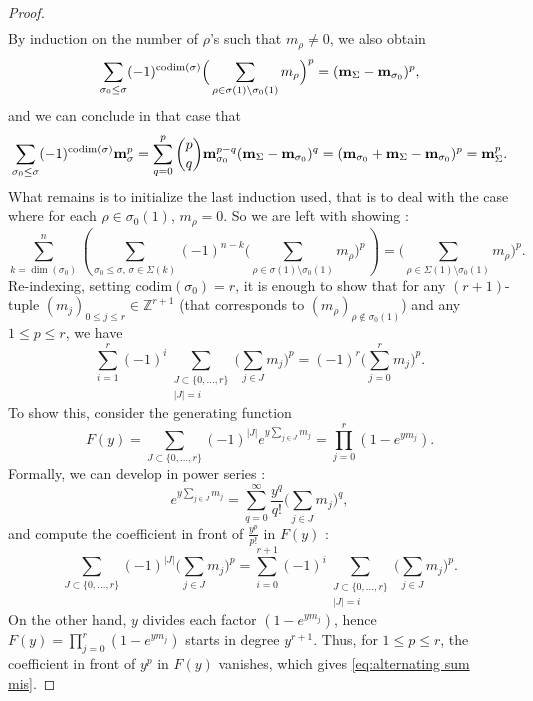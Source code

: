\documentclass[10pt,a4paper]{amsart}
\def\Z{\mathbb{Z}}
\def\codim{\mathrm{codim}}
\def\um{{\bf m}}
\begin{document}
\begin{proof}
$$\begin{array}{ccc}
 \end{array}
 $$
By induction on the number of $\rho$'s such that $m_\rho\neq 0$, we also obtain 
$$
\sum_{\sigma_0\leq\sigma} (-1)^{\codim(\sigma)} \Big(\sum_{\rho\in\sigma(1)\setminus\sigma_0(1)}m_\rho\Big)^p= (\um_\Sigma-\um_{\sigma_0})^p,
$$
and we can conclude in that case that 
$$
\sum_{\sigma_0\leq\sigma} (-1)^{\codim(\sigma)}\um_\sigma^p=\displaystyle \sum_{q=0}^{p} \binom{p}{q}\um_{\sigma_0}^{p-q}(\um_\Sigma-\um_{\sigma_0})^q=(\um_{\sigma_0}+\um_\Sigma-\um_{\sigma_0})^p=\um_\Sigma^p.
$$
What remains is to initialize the last induction used, that is to deal with the case where for each $\rho\in\sigma_0(1)$, $m_\rho=0$. So we are left with showing :
$$
\sum_{k=\dim(\sigma_0)}^n \left(\sum_{\sigma_0\leq\sigma,\,\sigma\in\Sigma(k)} (-1)^{n-k}\Big(\sum_{\rho\in\sigma(1)\setminus\sigma_0(1)}m_\rho\Big)^p\,\right)=\Big(\sum_{\rho\in\Sigma(1)\setminus \sigma_0(1)}m_\rho\Big)^p.
$$
Re-indexing, setting $\codim(\sigma_0)=r$, it is enough to show that for any $(r+1)$-tuple $(m_j)_{0\leq j\leq r}\in\Z^{r+1}$ (that corresponds to $(m_\rho)_{\rho\notin \sigma_0(1)}$) and any $1\leq p \leq r$, we have
\begin{equation}
 \label{eq:alternating sum mis}
\sum_{i=1}^{r} (-1)^i \sum_{\substack{J \subset \{0,\dots,r\} \\ |J|=i}} \Big(\sum_{j \in J} m_j\Big)^p=(-1)^r \Big(\sum_{j=0}^{r} m_j \Big)^p.
\end{equation}
To show this, consider the generating function
$$
F(y) = \sum_{J \subset \{0,\dots,r\}} (-1)^{|J|} e^{y \sum_{j \in J} m_j} = \prod_{j=0}^{r} (1 - e^{y m_j}).
$$
Formally, we can develop in power series :
$$
e^{y \sum_{j \in J} m_j} = \sum_{q=0}^{\infty} \frac{y^q}{q!} \Big(\sum_{j \in J} m_j\Big)^q,
$$
and compute the coefficient in front of $\displaystyle\frac{y^p}{p!}$ in $F(y)$ :
$$
\sum_{J \subset \{0,\dots,r\}} (-1)^{|J|} \Big(\sum_{j \in J} m_j\Big)^p = \sum_{i=0}^{r+1} (-1)^i \sum_{\substack{J \subset \{0,\dots,r\} \\ |J|=i}} \Big(\sum_{j \in J} m_j\Big)^p.
$$
On the other hand, $y$ divides each factor $(1-e^{y m_j})$, hence $F(y)=\prod_{j=0}^{r} (1 - e^{y m_j})$ starts in degree $y^{r+1}$.  
Thus, for $1 \leq p \leq r$, the coefficient in front of $y^p$ in $F(y)$ vanishes, which gives \eqref{eq:alternating sum mis}.
 \end{proof}
\end{document}
